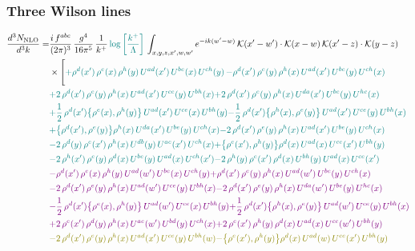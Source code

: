 \documentclass[9pt]{article}
\numberwithin{equation}{section}
\begin{document}
\subsubsection{Three Wilson lines}
\begin{align}
    \frac{d^{3}N_{\rm NLO}}{d^{3}k}= & \frac{i\,f^{abc}}{(2\pi)^{3}}\,\frac{g^{4}}{16\pi^{5}}\,\frac{1}{k^{+}}\,{\color{teal}\log{\left[\frac{k^{+}}{\Lambda}\right]}}\,\int_{x,y,z,x',w,w'}e^{-ik(w'-w)}\,\mathcal{K}(x'-w')\cdot\mathcal{K}(x-w)\,\mathcal{K}(x'-z)\cdot\mathcal{K}(y-z)\notag \\ & \times\Bigg[{\color{teal}+\rho^{d}(x')\,\rho^{e}(x)\,\rho^{h}(y)\,U^{ad}(x')\,U^{be}(x)\,U^{ch}(y)}\,{\color{teal}-\rho^{d}(x')\,\rho^{e}(y)\,\rho^{h}(x)\,U^{ad}(x')\,U^{be}(y)\,U^{ch}(x)}\notag \\ &{\color{teal}+2\,\rho^{d}(x')\,\rho^{e}(y)\,\rho^{h}(x)\,U^{ad}(x')\,U^{ce}(y)\,U^{bh}(x)}{\color{teal}+2\,\rho^{d}(x')\,\rho^{e}(y)\,\rho^{h}(x)\, U^{da}(x')\,U^{be}(y)\,U^{hc}(x)}\notag \\ & {\color{teal}+\frac{1}{2}\,\rho^{d}(x')\big\{\rho^{e}(x),\rho^{h}(y)\big\}\,U^{ad}(x')\,U^{ce}(x)\,U^{bh}(y)}{\color{teal}-\frac{1}{2}\,\rho^{d}(x')\big\{\rho^{h}(x),\rho^{e}(y)\big\}\,U^{ad}(x')\,U^{ce}(y)\,U^{bh}(x)}\notag \\ & {\color{teal}+\big\{\rho^{d}(x'),\rho^{e}(y)\big\}\rho^{h}(x)\,U^{da}(x')\,U^{be}(y)\,U^{ch}(x)}{\color{teal}-2\,\rho^{d}(x')\,\rho^{e}(y)\, \rho^{h}(x)\, U^{ad}(x')\,U^{be}(y)\,U^{ch}(x)}\notag \\ &{\color{teal}-2\,\rho^{d}(y)\,\rho^{e}(x')\, \rho^{h}(x)\, U^{db}(y)\,U^{ae}(x')\,U^{ch}(x)}{\color{teal}+\big\{\rho^{e}(x'),\rho^{h}(y)\big\}\rho^{d}(x)\,U^{ad}(x)\,U^{ce}(x')\,U^{bh}(y)}\notag \\ & {\color{teal}-2\,\rho^{h}(x')\,\rho^{e}(y)\,\rho^{d}(x)\,U^{be}(y)\,U^{ad}(x)\,U^{ch}(x')}{\color{teal}-2\,\rho^{h}(y)\,\rho^{e}(x')\,\rho^{d}(x)\,U^{bh}(y)\,U^{ad}(x)\,U^{ce}(x')}\notag \\ & {\color{violet}-\rho^{d}(x')\,\rho^{e}(x)\,\rho^{h}(y)\,U^{ad}(w')\,U^{be}(x)\,U^{ch}(y)}{\color{violet}+\rho^{d}(x')\,\rho^{e}(y)\,\rho^{h}(x)\,U^{ad}(w')\,U^{be}(y)\,U^{ch}(x)}\notag \\ &{\color{violet}-2\,\rho^{d}(x')\,\rho^{e}(y)\,\rho^{h}(x)\,U^{ad}(w')\,U^{ce}(y)\,U^{bh}(x)} {\color{violet}-2\,\rho^{d}(x')\,\rho^{e}(y)\,\rho^{h}(x)\, U^{da}(w')\,U^{be}(y)\,U^{hc}(x)}\notag \\ & {\color{violet}-\frac{1}{2}\,\rho^{d}(x')\big\{\rho^{e}(x),\rho^{h}(y)\big\}\,U^{ad}(w')\,U^{ce}(x)\,U^{bh}(y)}{\color{violet}+\frac{1}{2}\,\rho^{d}(x')\big\{\rho^{h}(x),\rho^{e}(y)\big\}\,U^{ad}(w')\,U^{ce}(y)\,U^{bh}(x)}\notag \\ & {\color{violet}+2\,\rho^{e}(x')\,\rho^{d}(y)\, \rho^{h}(x)\, U^{ae}(w')\,U^{bd}(y)\,U^{ch}(x)}{\color{violet}+2\,\rho^{e}(x')\,\rho^{h}(y)\,\rho^{d}(x)\,U^{ad}(x)\,U^{ce}(w')\,U^{bh}(y)}\notag \\ & {\color{olive}-2\,\rho^{d}(x')\,\rho^{e}(y)\,\rho^{h}(x)\,U^{ad}(x')\,U^{ce}(y)\,U^{bh}(w)}{\color{olive}-\big\{\rho^{e}(x'),\rho^{h}(y)\big\}\rho^{d}(x)\,U^{ad}(w)\,U^{ce}(x')\,U^{bh}(y)}\notag \\ & 
\end{align}
\end{document}
